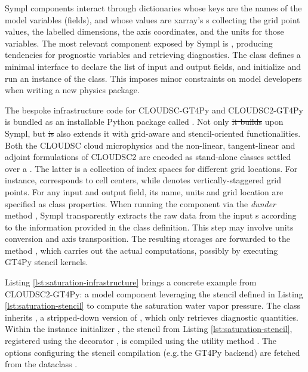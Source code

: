 \documentclass[gmd,manuscript,online]{copernicus}
\makeatletter
\theoremstyle{theorem}
\theoremstyle{definition}
\theoremstyle{remark}
\theoremstyle{proposition}
\providecommand{\DIFadd}[1]{{\protect\color{blue}\uwave{#1}}} %
\providecommand{\DIFdel}[1]{{\protect\color{red}\sout{#1}}} %
\providecommand{\DIFaddbegin}{} %
\providecommand{\DIFaddend}{} %
\providecommand{\DIFdelbegin}{} %
\providecommand{\DIFdelend}{} %
\newcommand{\DIFscaledelfig}{0.5}
\newlength{\DIFdelgraphicswidth} %
\newlength{\DIFdelgraphicsheight} %
\newcommand{\DIFaddincludegraphics}[2][]{{\color{blue}\fbox{\DIFOincludegraphics[#1]{#2}}}} %
\newcommand{\DIFdelincludegraphics}[2][]{%
\sbox{\DIFdelgraphicsbox}{\DIFOincludegraphics[#1]{#2}}%
\settoboxwidth{\DIFdelgraphicswidth}{\DIFdelgraphicsbox} %
\settoboxtotalheight{\DIFdelgraphicsheight}{\DIFdelgraphicsbox} %
\scalebox{\DIFscaledelfig}{%
\parbox[b]{\DIFdelgraphicswidth}{\usebox{\DIFdelgraphicsbox}\\[-\baselineskip] \rule{\DIFdelgraphicswidth}{0em}}\llap{\resizebox{\DIFdelgraphicswidth}{\DIFdelgraphicsheight}{%
\setlength{\unitlength}{\DIFdelgraphicswidth}%
\begin{picture}(1,1)%
\thicklines\linethickness{2pt} %
{\color[rgb]{1,0,0}\put(0,0){\framebox(1,1){}}}%
{\color[rgb]{1,0,0}\put(0,0){\line( 1,1){1}}}%
{\color[rgb]{1,0,0}\put(0,1){\line(1,-1){1}}}%
\end{picture}%
}\hspace*{3pt}}} %
} %
\DeclareRobustCommand{\DIFaddbegin}{\DIFOaddbegin \let\includegraphics\DIFaddincludegraphics} %
\DeclareRobustCommand{\DIFaddend}{\DIFOaddend \let\includegraphics\DIFOincludegraphics} %
\DeclareRobustCommand{\DIFdelbegin}{\DIFOdelbegin \let\includegraphics\DIFdelincludegraphics} %
\DeclareRobustCommand{\DIFdelend}{\DIFOaddend \let\includegraphics\DIFOincludegraphics} %
\let\sout@orig\sout %
\renewcommand{\sout}[1]{\ifmmode\text{\sout@orig{\ensuremath{#1}}}\else\sout@orig{#1}\fi} %
\makeatother
\begin{document}
	Sympl components interact through dictionaries whose keys are the names of the model variables (fields), and whose values are xarray's s \citep{hoyer17} collecting the grid point values, the labelled dimensions, the axis coordinates, and the units for those variables. The most relevant component exposed by Sympl is , producing tendencies for prognostic variables and retrieving diagnostics. The class defines a minimal interface to declare the list of input and output fields, and initialize and run an instance of the class. This imposes minor constraints on model developers when writing a new physics package.

	The bespoke infrastructure code for CLOUDSC-GT4Py and CLOUDSC2-GT4Py is bundled as an installable Python package called . Not only \DIFdelbegin \DIFdel{it builds }\DIFdelend \DIFaddbegin \DIFadd{does it build }\DIFaddend upon Sympl, but \DIFdelbegin \DIFdel{is }\DIFdelend also extends it with grid-aware and stencil-oriented functionalities. Both the CLOUDSC cloud microphysics and the non-linear, tangent-linear and adjoint formulations of CLOUDSC2 are encoded as stand-alone  classes settled over a . The latter is a collection of index spaces for different grid locations. For instance,  corresponds to cell centers, while  denotes vertically-staggered grid points. For any input and output field, its name, units and grid location are specified as class properties. When running the component via the \emph{dunder} method , Sympl transparently extracts the raw data from the input s according to the information provided in the class definition. This step may involve units conversion and axis transposition. The resulting storages are forwarded to the method , which carries out the actual computations, possibly by executing GT4Py stencil kernels.

	Listing \ref{lst:saturation-infrastructure} brings a concrete example from CLOUDSC2-GT4Py: a model component leveraging the stencil defined in Listing \ref{lst:saturation-stencil} to compute the saturation water vapor pressure. The class inherits , a stripped-down version of , which only retrieves diagnostic quantities. Within the instance initializer , the stencil from Listing \ref{lst:saturation-stencil}, registered using the decorator , is compiled using the utility method . The options configuring the stencil compilation (e.g.\,the GT4Py backend) are fetched from the dataclass .
\end{document}
